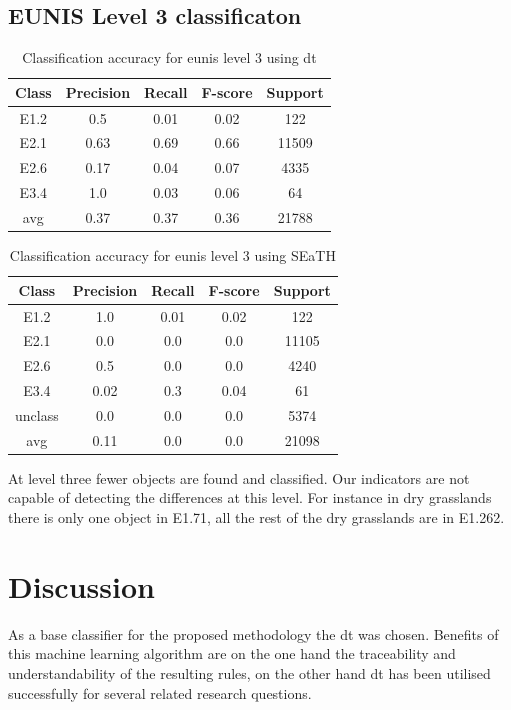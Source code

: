 \documentclass[authoryear,review,12pt,number]{elsarticle}
\begin{document}
\subsection{EUNIS Level 3 classificaton}
\begin{table}
\centering
\begin{tabular}{c c c c c}
Class & Precision & Recall & F-score & Support\\
\hline
E1.2 & 0.5 & 0.01 & 0.02 & 122\\
E2.1 & 0.63 & 0.69 & 0.66 & 11509\\
E2.6 & 0.17 & 0.04 & 0.07 & 4335\\
E3.4 & 1.0 & 0.03 & 0.06 & 64\\
avg & 0.37 & 0.37 & 0.36 & 21788\\
\end{tabular}
\caption{Classification accuracy for \gls{eunis} level 3 using \gls{dt}}
\end{table}
\begin{table}
\centering
\begin{tabular}{c c c c c}
Class & Precision & Recall & F-score & Support\\
\hline
E1.2 & 1.0 & 0.01 & 0.02 & 122\\
E2.1 & 0.0 & 0.0 & 0.0 & 11105\\
E2.6 & 0.5 & 0.0 & 0.0 & 4240\\
E3.4 & 0.02 & 0.3 & 0.04 & 61\\
unclass & 0.0 & 0.0 & 0.0 & 5374\\
avg & 0.11 & 0.0 & 0.0 & 21098\\
\end{tabular}
\caption{Classification accuracy for \gls{eunis} level 3 using SEaTH}
\end{table}
At level three fewer objects are found and classified. Our indicators are not 
capable of detecting the differences at this level. For instance in dry 
grasslands there is only one object in E1.71, all the rest of the dry 
grasslands are in E1.262.



\section{Discussion}
As a base classifier for the proposed methodology the \gls{dt} was chosen.
Benefits of this machine learning algorithm are on the one hand the traceability
and understandability of the resulting rules, on the other hand \gls{dt} has
been utilised successfully for several related research questions. %
\end{document}
